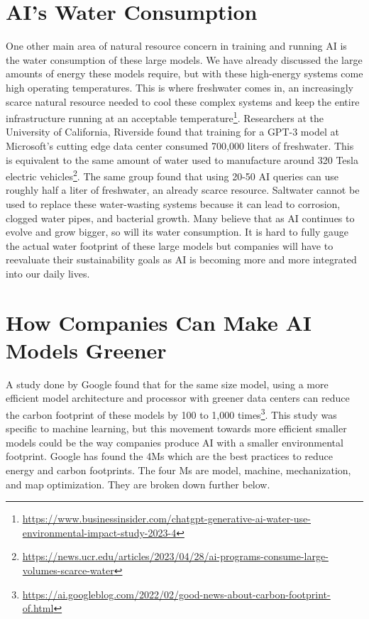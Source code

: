 \documentclass[
]{book}
\begin{document}
\hypertarget{ais-water-consumption}{%
\section{AI's Water Consumption}\label{ais-water-consumption}}

One other main area of natural resource concern in training and running AI is the water consumption of these large models. We have already discussed the large amounts of energy these models require, but with these high-energy systems come high operating temperatures. This is where freshwater comes in, an increasingly scarce natural resource needed to cool these complex systems and keep the entire infrastructure running at an acceptable temperature\footnote{\url{https://www.businessinsider.com/chatgpt-generative-ai-water-use-environmental-impact-study-2023-4}}. Researchers at the University of California, Riverside found that training for a GPT-3 model at Microsoft's cutting edge data center consumed 700,000 liters of freshwater. This is equivalent to the same amount of water used to manufacture around 320 Tesla electric vehicles\footnote{\url{https://news.ucr.edu/articles/2023/04/28/ai-programs-consume-large-volumes-scarce-water}}. The same group found that using 20-50 AI queries can use roughly half a liter of freshwater, an already scarce resource. Saltwater cannot be used to replace these water-wasting systems because it can lead to corrosion, clogged water pipes, and bacterial growth. Many believe that as AI continues to evolve and grow bigger, so will its water consumption. It is hard to fully gauge the actual water footprint of these large models but companies will have to reevaluate their sustainability goals as AI is becoming more and more integrated into our daily lives.

\hypertarget{how-companies-can-make-ai-models-greener}{%
\section{How Companies Can Make AI Models Greener}\label{how-companies-can-make-ai-models-greener}}

A study done by Google found that for the same size model, using a more efficient model architecture and processor with greener data centers can reduce the carbon footprint of these models by 100 to 1,000 times\footnote{\url{https://ai.googleblog.com/2022/02/good-news-about-carbon-footprint-of.html}}. This study was specific to machine learning, but this movement towards more efficient smaller models could be the way companies produce AI with a smaller environmental footprint. Google has found the 4Ms which are the best practices to reduce energy and carbon footprints. The four Ms are model, machine, mechanization, and map optimization. They are broken down further below.
\end{document}
